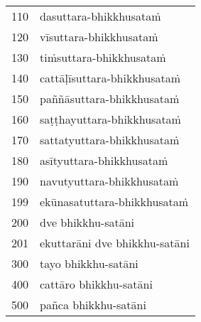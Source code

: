 \begin{multicols}{4}
\begin{supertabular}{l|l}
110	&	dasuttara-bhikkhusataṁ\\
120	&	vīsuttara-bhikkhusataṁ\\
130	&	tiṁsuttara-bhikkhusataṁ\\
140	&	cattāḷīsuttara-bhikkhusataṁ\\
150	&	paññāsuttara-bhikkhusataṁ\\
160	&	saṭṭhayuttara-bhikkhusataṁ\\
170	&	sattatyuttara-bhikkhusataṁ\\
180	&	asītyuttara-bhikkhusataṁ\\
190	&	navutyuttara-bhikkhusataṁ\\
199	&	ekūnasatuttara-bhikkhusataṁ\\
200	&	dve bhikkhu-satāni\\
201	&	ekuttarāni dve bhikkhu-satāni\\
300	&	tayo bhikkhu-satāni\\
400	&	cattāro bhikkhu-satāni\\
500	&	pañca bhikkhu-satāni
\end{supertabular}
\end{multicols}
